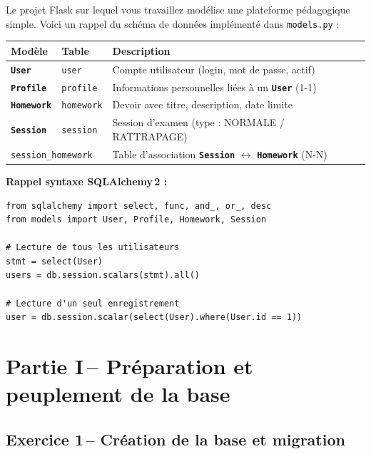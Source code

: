 \documentclass[12pt,a4paper]{article}
\newcommand{\fichier}[1]{\texttt{\textcolor{primary}{#1}}}
\newcommand{\kw}[1]{\texttt{\textbf{#1}}}
\begin{document}
Le projet Flask sur lequel vous travaillez modélise une plateforme pédagogique simple.
Voici un rappel du schéma de données implémenté dans \fichier{models.py} :

\begin{center}
\begin{tabular}{lll}
\toprule
\textbf{Modèle} & \textbf{Table} & \textbf{Description} \\
\midrule
\kw{User}     & \texttt{user}          & Compte utilisateur (login, mot de passe, actif) \\
\kw{Profile}  & \texttt{profile}       & Informations personnelles liées à un \kw{User} (1-1) \\
\kw{Homework} & \texttt{homework}      & Devoir avec titre, description, date limite \\
\kw{Session}  & \texttt{session}       & Session d'examen (type : NORMALE / RATTRAPAGE) \\
\multicolumn{2}{l}{\texttt{session\_homework}} & Table d'association \kw{Session} $\leftrightarrow$ \kw{Homework} (N-N) \\
\bottomrule
\end{tabular}
\end{center}

\begin{mdframed}[style=rappel]
\textbf{Rappel syntaxe SQLAlchemy\,2 :}
\begin{lstlisting}
from sqlalchemy import select, func, and_, or_, desc
from models import User, Profile, Homework, Session

# Lecture de tous les utilisateurs
stmt = select(User)
users = db.session.scalars(stmt).all()

# Lecture d'un seul enregistrement
user = db.session.scalar(select(User).where(User.id == 1))
\end{lstlisting}
\end{mdframed}

\section{Partie I\,– Préparation et peuplement de la base}

\subsection{Exercice 1\,– Création de la base et migration}
\end{document}
